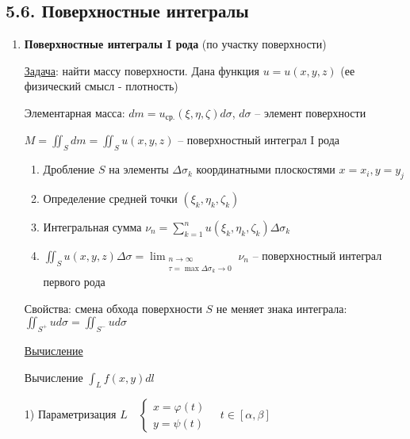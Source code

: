 \documentclass[12pt]{article}
\begin{document}
    \subsection{5.6. Поверхностные интегралы}

    \hypertarget{surfaceintegraloffirstkind}{}

    \begin{enumerate}[label*=\textbf{\arabic** }]
    \item \textbf{Поверхностные интегралы I рода} (по участку поверхности)

    \underline{Задача}: найти массу поверхности. Дана функция $u = u(x, y, z)$ (ее физический смысл - плотность)

    Элементарная масса: $dm = u_{\text{ср.}}(\xi, \eta, \zeta) d\sigma$, $d\sigma$ -- элемент поверхности

    $M = \iint_S dm = \iint_S u(x, y, z)$ -- поверхностный интеграл I рода

    \begin{enumerate}
        \item Дробление $S$ на элементы $\Delta \sigma_k$ координатными плоскостями $x = x_i, y = y_j$

        \item Определение средней точки $(\xi_k, \eta_k, \zeta_k)$

        \item Интегральная сумма $\nu_n = \sum_{k = 1}^{n} u(\xi_k, \eta_k, \zeta_k) \Delta \sigma_k$

        \item \Defs $\iint_S u(x, y, z) \Delta \sigma = \lim_{\substack{n \to \infty \\ \tau = \max \Delta \sigma_k \to 0}} \nu_n$ -- поверхностный интеграл первого рода
    \end{enumerate}

    \hypertarget{surfaceintegraloffirstkindproperties}{}

    Свойства: смена обхода поверхности $S$ не меняет знака интеграла: $\iint_{S^+} u d\sigma = \iint_{S^-} u d\sigma$

    \mediumvspace


    \underline{Вычисление}

    \Mems Вычисление $\int_L f(x, y) dl$

    1) Параметризация $L \quad \begin{cases}x = \varphi(t) \\ y = \psi(t)\end{cases} \quad t \in [\alpha, \beta]$


\end{enumerate}
\end{document}
